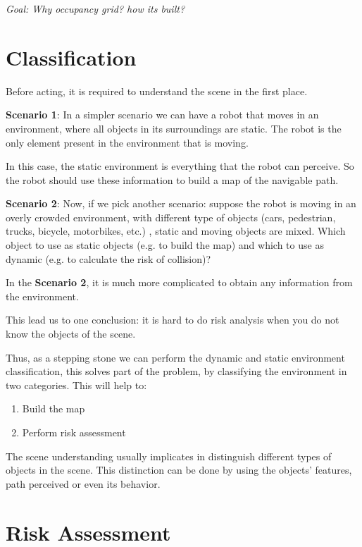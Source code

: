 \textit{Goal: Why occupancy grid? how its built? }

\section{Classification}

Before acting, it is required to understand the scene in the first place.

\textbf{Scenario 1}: In a simpler scenario we can have a robot that moves in an environment, where all objects in its surroundings are static. The robot is the only element present in the environment that is moving.

In this case, the static environment is everything that the robot can perceive. So the robot should use these information to build a map of the navigable path.

\textbf{Scenario 2}: Now, if we pick another scenario: suppose the robot is moving in an overly crowded environment, with different type of objects (cars, pedestrian, trucks, bicycle, motorbikes, etc.) , static and moving objects are mixed. Which object to use as static objects (e.g. to build the map) and which to use as dynamic (e.g. to calculate the risk of collision)? 

In the \textbf{Scenario 2}, it is much more complicated to obtain any information from the environment.

This lead us to one conclusion: it is hard to do risk analysis when you do not know the objects of the scene.

Thus, as a stepping stone we can perform the dynamic and static environment classification, this solves part of the problem, by classifying the environment in two categories. This will help to:

\begin{enumerate}
\item Build the map
\item Perform risk assessment
\end{enumerate}

The scene understanding usually implicates in distinguish different types of objects in the scene. This distinction can be done by using the objects' features, path perceived or even its behavior. 


\section{Risk Assessment}

